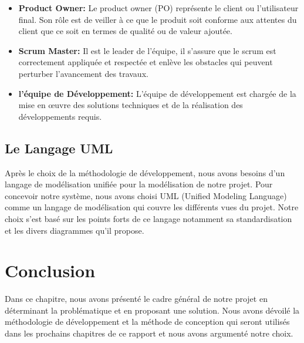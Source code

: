 \begin{itemize}
  \item \small\textbf{Product Owner: } Le product owner (PO) représente le client ou l'utilisateur final. Son rôle est de veiller à ce que le produit soit conforme aux attentes du client que ce soit en termes de qualité ou de valeur ajoutée.
  
  \item \small\textbf{Scrum Master: } Il est le leader de l'équipe, il s'assure que le scrum est correctement appliquée et respectée et enlève les obstacles qui peuvent perturber l'avancement des travaux.
  
  \item \small\textbf{l'équipe de Développement: } L'équipe de développement est chargée de la mise en œuvre des solutions techniques et de la réalisation des développements requis.
\end{itemize}

\subsection{Le Langage UML}
\noindent
Après le choix de la méthodologie de développement, nous avons besoins d’un langage de modélisation unifiée pour la modélisation de notre projet. Pour concevoir notre système, nous avons choisi UML (Unified Modeling Language) comme un langage de modélisation qui couvre les différents vues du projet. Notre choix s’est basé sur les points forts de ce langage notamment sa standardisation et les divers diagrammes qu’il propose.

\section{Conclusion}
\noindent
Dans ce chapitre, nous avons présenté le cadre général de notre projet en déterminant la problématique et en proposant une solution. Nous avons dévoilé la méthodologie de développement et la méthode de conception qui seront utilisés dans les prochains chapitres de ce rapport et nous avons argumenté notre choix.

\newpage